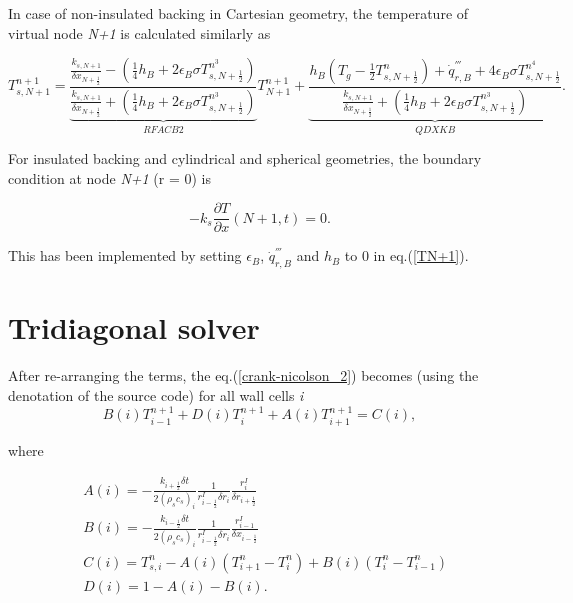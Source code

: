 In case of non-insulated backing in Cartesian geometry, the temperature of virtual node \textit{N+1} is calculated similarly as

\begin{equation}
\label{TN+1}
  T_{s,N+1}^{n+1} = \underbrace{\frac{\frac{k_{s,N+1}}{\delta x_{N+\frac{1}{2}}}-(\frac{1}{4}h_B+2\epsilon_B \sigma T_{s,N+\frac{1}{2}}^{n^3})}{\frac{k_{s,N+1}}{\delta x_{N+\frac{1}{2}}}+(\frac{1}{4}h_B+2\epsilon_B \sigma T_{s,N+\frac{1}{2}}^{n^3})}}_{RFACB2} T_{N+1}^{n+1}+
 \underbrace{\frac{h_B(T_g-\frac{1}{2}T_{s,N+\frac{1}{2}}^n)+\dot{q}_{r,B}^{'''}+4\epsilon_B \sigma T_{s,N+\frac{1}{2}}^{n^4}}{\frac{k_{s,N+1}}{\delta x_{N+\frac{1}{2}}}+(\frac{1}{4}h_B+2\epsilon_B \sigma T_{s,N+\frac{1}{2}}^{n^3})}}_{QDXKB}.
\end{equation}

For insulated backing and cylindrical and spherical geometries, the boundary condition at node \textit{N+1} (r = 0) is

\begin{equation}
\label{bc_back}
  -k_s \frac{\partial T}{\partial x} (N+1,t) = 0.
\end{equation}

This has been implemented by setting $\epsilon_B$, $\dot{q}_{r,B}^{'''}$ and $h_B$ to 0 in eq.(\ref{TN+1}). 

\section{Tridiagonal solver}
After re-arranging the terms, the eq.(\ref{crank-nicolson_2}) becomes (using the denotation of the source code) for all wall cells \textit{i}
 \begin{equation}
\label{tridiagonal_1}
  B(i)T_{i-1}^{n+1} + D(i)T_{i}^{n+1} + A(i)T_{i+1}^{n+1} = C(i),
\end{equation}

where

\begin{equation}
\label{tridiagonal_2}
\begin{split}
& A(i) = -\frac{k_{i+\frac{1}{2}}\delta t}{2(\rho_s c_s)_i}\frac{1}{r_{i-\frac{1}{2}}^I \delta r_i}\frac{r_{i}^I}{\delta r_{i+\frac{1}{2}}} \\
& B(i) = -\frac{k_{i-\frac{1}{2}}\delta t}{2(\rho_s c_s)_i}\frac{1}{r_{i-\frac{1}{2}}^I \delta r_i}\frac{r_{i-1}^I}{\delta x_{i-\frac{1}{2}}}  \\
& C(i) = T_{s,i}^{n}-A(i)(T_{i+1}^n-T_i^n) + B(i) (T_{i}^n-T_{i-1}^n) \\
& D(i) = 1-A(i)-B(i).  \\
\end{split}
\end{equation}

